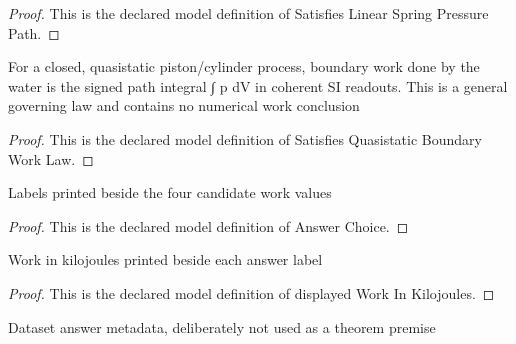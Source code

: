 \begin{proof}
  This is the declared model definition of Satisfies Linear Spring Pressure Path.
\end{proof}
\begin{definition}
  \label{def:physics:phyx-mini-0450:phyxminiproblems-problemphyxmini0450-satisfiesquasistaticboundaryworklaw}
  For a closed, quasistatic piston/cylinder process, boundary work done by the water is the signed path integral ∫ p dV in coherent SI readouts. This is a general governing law and contains no numerical work conclusion
\end{definition}
\begin{proof}
  This is the declared model definition of Satisfies Quasistatic Boundary Work Law.
\end{proof}
\begin{definition}
  \label{def:physics:phyx-mini-0450:phyxminiproblems-problemphyxmini0450-answerchoice}
  Labels printed beside the four candidate work values
\end{definition}
\begin{proof}
  This is the declared model definition of Answer Choice.
\end{proof}
\begin{definition}
  \label{def:physics:phyx-mini-0450:phyxminiproblems-problemphyxmini0450-displayedworkinkilojoules}
  Work in kilojoules printed beside each answer label
\end{definition}
\begin{proof}
  This is the declared model definition of displayed Work In Kilojoules.
\end{proof}
\begin{definition}
  \label{def:physics:phyx-mini-0450:phyxminiproblems-problemphyxmini0450-recordeddatasetanswer}
  Dataset answer metadata, deliberately not used as a theorem premise
\end{definition}
